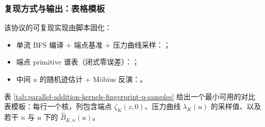 \subsubsection{复现方式与输出：表格模板}
该协议的可复现实现由脚本固化：
\begin{itemize}
  \item 单流 BFS 编译 + 端点基准 + 压力曲线采样：；
  \item 端点 primitive 谱表（闭式零误差）：；
  \item 中间 $u$ 的随机迹估计 + Möbius 反演：。
\end{itemize}
表 \ref{tab:parallel-addition-kernels-fingerprint-u-samples} 给出一个最小可用的对比表模板：每行一个核，列包含端点 $\zeta_K(z,0)$、压力曲线 $\lambda_K(u)$ 的采样值、以及若干 $n$ 与 $u$ 下的 $\widehat B_{K,n}(u)$。

